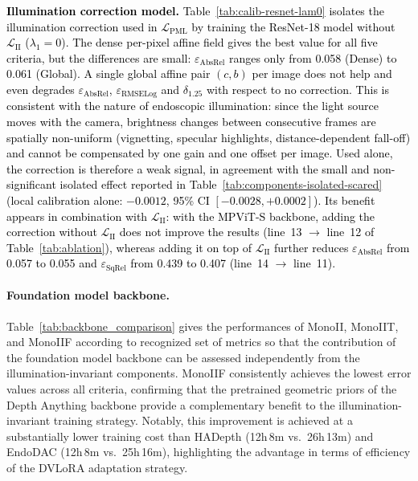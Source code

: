 \documentclass[a4paper,fleqn]{cas-dc}
\begin{document}
\noindent\textcolor{black}{{\bf Illumination correction model.}
Table~\ref{tab:calib-resnet-lam0} isolates the illumination correction used in $\mathcal{L}_\textrm{PML}$ by training the ResNet-18 model without $\mathcal{L}_\textrm{II}$ ($\lambda_1=0$). The dense per-pixel affine field gives the best value for all five criteria, but the differences are small: $\varepsilon_\textrm{AbsRel}$ ranges only from 0.058 (Dense) to 0.061 (Global). A single global affine pair $(c,b)$ per image does not help and even degrades $\varepsilon_\textrm{AbsRel}$, $\varepsilon_\textrm{RMSELog}$ and $\delta_{1.25}$ with respect to no correction. This is consistent with the nature of endoscopic illumination: since the light source moves with the camera, brightness changes between consecutive frames are spatially non-uniform (vignetting, specular highlights, distance-dependent fall-off) and cannot be compensated by one gain and one offset per image.
Used alone, the correction is therefore a weak signal, in agreement with the small and non-significant isolated effect reported in Table~\ref{tab:components-isolated-scared} (local calibration alone: $-0.0012$, 95\% CI $[-0.0028, +0.0002]$). Its benefit appears in combination with $\mathcal{L}_\textrm{II}$: with the MPViT-S backbone, adding the correction without $\mathcal{L}_\textrm{II}$ does not improve the results (line~13 $\rightarrow$ line~12 of Table~\ref{tab:ablation}), whereas adding it on top of $\mathcal{L}_\textrm{II}$ further reduces $\varepsilon_\textrm{AbsRel}$ from 0.057 to 0.055 and $\varepsilon_\textrm{SqRel}$ from 0.439 to 0.407 (line~14 $\rightarrow$ line~11).}
%
\paragraph{Foundation model backbone.}

Table~\ref{tab:backbone_comparison} gives the performances of MonoII, MonoIIT, and MonoIIF according to recognized set of metrics so that the contribution of the foundation model backbone can be  assessed independently from the illumination-invariant components. MonoIIF consistently achieves the lowest error values across all criteria, confirming that the pretrained geometric priors of the Depth Anything backbone provide a complementary benefit to the illumination-invariant training strategy. Notably, this improvement is achieved at a substantially lower training cost than HADepth (12h\,8m vs.\ 26h\,13m) and EndoDAC (12h\,8m vs.\ 25h\,16m), highlighting the  advantage in terms of efficiency of the DVLoRA adaptation strategy.
\vspace*{1mm} \\
\end{document}
